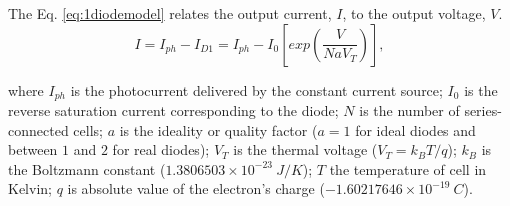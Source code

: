 \documentclass[review]{elsarticle}
\begin{document}
The Eq. \eqref{eq:1diodemodel} relates the output current, $I$, to the output voltage, $V$. %
\begin{equation}
\label{eq:1diodemodel}
I = I_{ph}-I_{D1}=I_{ph}-I_{0}\left[ exp \left( \dfrac{V}{NaV_{T}} \right)  \right], 
\end{equation}

\noindent where $I_{ph}$ is the photocurrent delivered by the constant current source; $I_{0}$ is the reverse saturation current corresponding to the diode; $N$ is the number of series-connected cells; %
$a$ is the ideality or quality factor ($a=1$ for ideal diodes and between $1$ and $2$ for real diodes); $V_{T}$ is the thermal voltage ($ V_{T}=k_{B}T/q $); $ k_{B} $ is the Boltzmann constant ($ 1.3806503\times10^{-23}\:J/K $); $T$ the temperature of cell in Kelvin; $q$ is absolute value of the electron's charge ($ -1.60217646\times10^{-19}\:C $).
\end{document}
